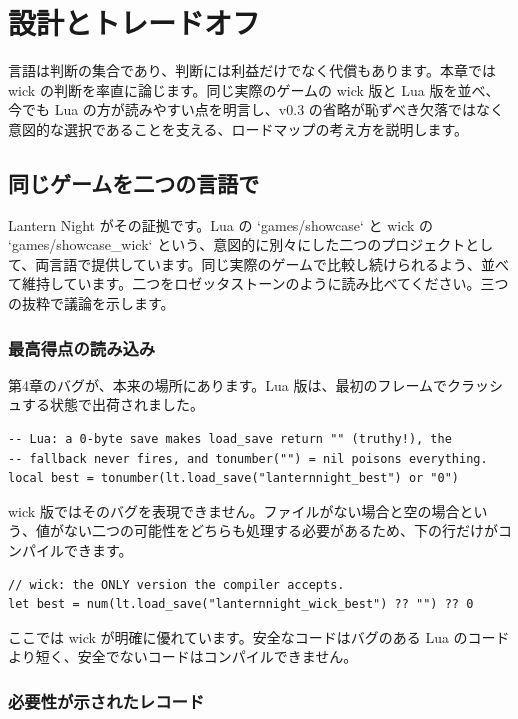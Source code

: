 \chapter{設計とトレードオフ}

言語は判断の集合であり、判断には利益だけでなく代償もあります。本章では wick の判断を率直に論じます。同じ実際のゲームの wick 版と Lua 版を並べ、今でも Lua の方が読みやすい点を明言し、v0.3 の省略が恥ずべき欠落ではなく意図的な選択であることを支える、ロードマップの考え方を説明します。

\section{同じゲームを二つの言語で}

Lantern Night がその証拠です。Lua の `games/showcase` と wick の `games/showcase_wick` という、意図的に別々にした二つのプロジェクトとして、両言語で提供しています。同じ実際のゲームで比較し続けられるよう、並べて維持しています。二つをロゼッタストーンのように読み比べてください。三つの抜粋で議論を示します。

\subsection{最高得点の読み込み}

第4章のバグが、本来の場所にあります。Lua 版は、最初のフレームでクラッシュする状態で出荷されました。

\begin{lstlisting}[language=luatwin]
-- Lua: a 0-byte save makes load_save return "" (truthy!), the
-- fallback never fires, and tonumber("") = nil poisons everything.
local best = tonumber(lt.load_save("lanternnight_best") or "0")
\end{lstlisting}

\noindent
wick 版ではそのバグを表現できません。ファイルがない場合と空の場合という、値がない二つの可能性をどちらも処理する必要があるため、下の行だけがコンパイルできます。

\begin{lstlisting}[language=wick]
// wick: the ONLY version the compiler accepts.
let best = num(lt.load_save("lanternnight_wick_best") ?? "") ?? 0
\end{lstlisting}

\noindent
ここでは wick が明確に優れています。安全なコードはバグのある Lua のコードより短く、安全でないコードはコンパイルできません。

\subsection{必要性が示されたレコード}

